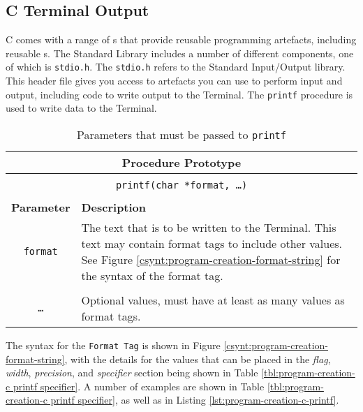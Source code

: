 \clearpage
\subsection{C Terminal Output} %
\label{sub:c_console_output}

C comes with a range of s that provide reusable programming artefacts, including reusable s. The Standard Library includes a number of different components, one of which is \texttt{stdio.h}. The \texttt{stdio.h} refers to the Standard Input/Output library. This header file gives you access to artefacts you can use to perform input and output, including code to write output to the Terminal. The \texttt{printf} procedure is used to write data to the Terminal.

\begin{table}[h]
  \centering
  \begin{tabular}{|c|p{9cm}|}
    \hline
    \multicolumn{2}{|c|}{\textbf{Procedure Prototype}} \\
    \hline
    \multicolumn{2}{|c|}{} \\
    \multicolumn{2}{|c|}{\texttt{printf(char *format, \ldots )}} \\
    \multicolumn{2}{|c|}{} \\
    \hline
    \textbf{Parameter} & \textbf{Description} \\
    \hline
    \texttt{ format } & The text that is to be written to the Terminal. This text may contain format tags to include other values. See Figure \ref{csynt:program-creation-format-string} for the syntax of the format tag. \\
    & \\
    \texttt{\ldots}   & Optional values, must have at least as many values as format tags. \\
    \hline
  \end{tabular}
  \caption{Parameters that must be passed to \texttt{printf}}
  \label{tbl:program-creation-c printf parameters}
\end{table}

The syntax for the \texttt{Format Tag} is shown in Figure \ref{csynt:program-creation-format-string}, with the details for the values that can be placed in the \emph{flag}, \emph{width}, \emph{precision}, and \emph{specifier} section being shown in Table \vref{tbl:program-creation-c printf specifier}. A number of examples are shown in Table \ref{tbl:program-creation-c printf specifier}, as well as in Listing \ref{lst:program-creation-c-printf}.

